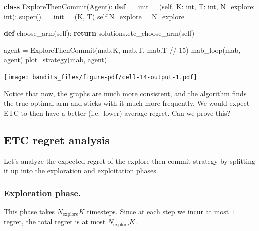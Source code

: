 \documentclass[
  letterpaper,
  DIV=11,
  numbers=noendperiod]{scrreprt}
\newenvironment{Shaded}{\begin{snugshade}}{\end{snugshade}}
\newcommand{\BuiltInTok}[1]{\textcolor[rgb]{0.00,0.23,0.31}{#1}}
\newcommand{\ControlFlowTok}[1]{\textcolor[rgb]{0.00,0.23,0.31}{\textbf{#1}}}
\newcommand{\DecValTok}[1]{\textcolor[rgb]{0.68,0.00,0.00}{#1}}
\newcommand{\FunctionTok}[1]{\textcolor[rgb]{0.28,0.35,0.67}{#1}}
\newcommand{\KeywordTok}[1]{\textcolor[rgb]{0.00,0.23,0.31}{\textbf{#1}}}
\newcommand{\NormalTok}[1]{\textcolor[rgb]{0.00,0.23,0.31}{#1}}
\newcommand{\OperatorTok}[1]{\textcolor[rgb]{0.37,0.37,0.37}{#1}}
\newcommand{\VariableTok}[1]{\textcolor[rgb]{0.07,0.07,0.07}{#1}}
\theoremstyle{plain}
\theoremstyle{plain}
\theoremstyle{definition}
\theoremstyle{definition}
\theoremstyle{remark}
\begin{document}
\begin{Shaded}
\begin{Highlighting}[]
\KeywordTok{class}\NormalTok{ ExploreThenCommit(Agent):}
    \KeywordTok{def} \FunctionTok{\_\_init\_\_}\NormalTok{(}\VariableTok{self}\NormalTok{, K: }\BuiltInTok{int}\NormalTok{, T: }\BuiltInTok{int}\NormalTok{, N\_explore: }\BuiltInTok{int}\NormalTok{):}
        \BuiltInTok{super}\NormalTok{().}\FunctionTok{\_\_init\_\_}\NormalTok{(K, T)}
        \VariableTok{self}\NormalTok{.N\_explore }\OperatorTok{=}\NormalTok{ N\_explore}

    \KeywordTok{def}\NormalTok{ choose\_arm(}\VariableTok{self}\NormalTok{):}
        \ControlFlowTok{return}\NormalTok{ solutions.etc\_choose\_arm(}\VariableTok{self}\NormalTok{)}
\end{Highlighting}
\end{Shaded}

\begin{Shaded}
\begin{Highlighting}[]
\NormalTok{agent }\OperatorTok{=}\NormalTok{ ExploreThenCommit(mab.K, mab.T, mab.T }\OperatorTok{//} \DecValTok{15}\NormalTok{)}
\NormalTok{mab\_loop(mab, agent)}
\NormalTok{plot\_strategy(mab, agent)}
\end{Highlighting}
\end{Shaded}

\texttt{[image: bandits\_files/figure-pdf/cell-14-output-1.pdf]}

Notice that now, the graphs are much more consistent, and the algorithm
finds the true optimal arm and sticks with it much more frequently. We
would expect ETC to then have a better (i.e.~lower) average regret. Can
we prove this?

\subsection{ETC regret analysis}\label{sec-etc-regret-analysis}

Let's analyze the expected regret of the explore-then-commit strategy by
splitting it up into the exploration and exploitation phases.

\subsubsection{Exploration phase.}\label{exploration-phase.}

This phase takes \(N_{\text{explore}}K\) timesteps. Since at each step
we incur at most \(1\) regret, the total regret is at most
\(N_{\text{explore}}K\).
\end{document}
